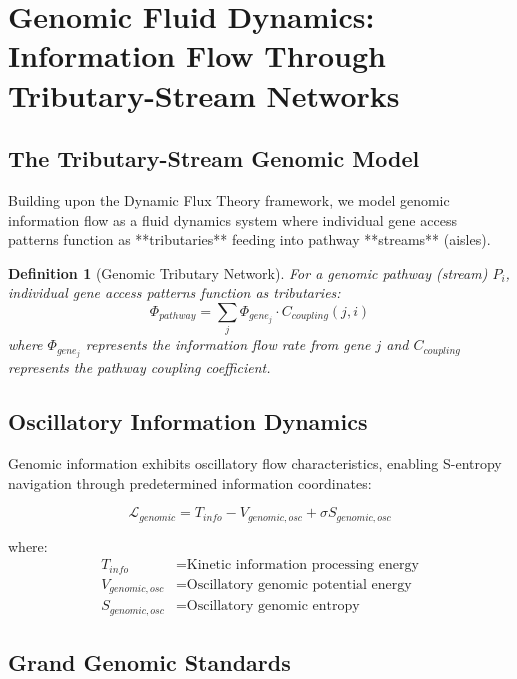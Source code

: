 \documentclass[12pt,a4paper]{article}
\newtheorem{definition}[theorem]{Definition}
\begin{document}
\section{Genomic Fluid Dynamics: Information Flow Through Tributary-Stream Networks}

\subsection{The Tributary-Stream Genomic Model}

Building upon the Dynamic Flux Theory framework, we model genomic information flow as a fluid dynamics system where individual gene access patterns function as **tributaries** feeding into pathway **streams** (aisles).

\begin{definition}[Genomic Tributary Network]
For a genomic pathway (stream) $P_i$, individual gene access patterns function as tributaries:
\begin{equation}
\Phi_{pathway} = \sum_{j} \Phi_{gene_j} \cdot C_{coupling}(j,i)
\end{equation}
where $\Phi_{gene_j}$ represents the information flow rate from gene $j$ and $C_{coupling}$ represents the pathway coupling coefficient.
\end{definition}

\subsection{Oscillatory Information Dynamics}

Genomic information exhibits oscillatory flow characteristics, enabling S-entropy navigation through predetermined information coordinates:

\begin{equation}
\mathcal{L}_{genomic} = T_{info} - V_{genomic,osc} + \sigma S_{genomic,osc}
\end{equation}

where:
\begin{align}
T_{info} &= \text{Kinetic information processing energy} \\
V_{genomic,osc} &= \text{Oscillatory genomic potential energy} \\
S_{genomic,osc} &= \text{Oscillatory genomic entropy}
\end{align}

\subsection{Grand Genomic Standards}
\end{document}
